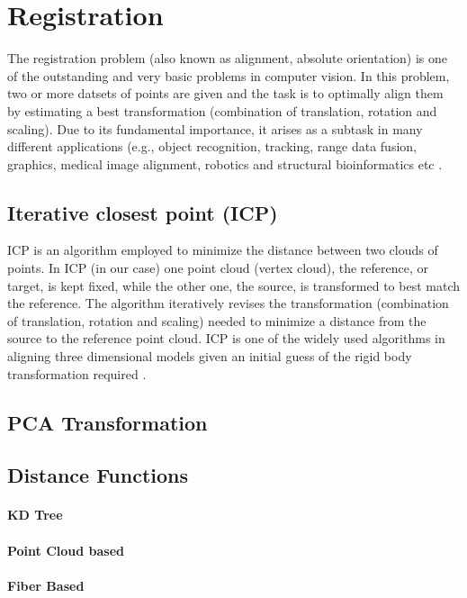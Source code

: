 \documentclass[../structure.tex]{subfiles}
\begin{document}
\section{Registration}
	The registration problem (also known as alignment, absolute orientation) is one of the outstanding and very basic problems in computer vision. In this problem, two or more datsets of points are given and the task is to optimally align them by estimating a best transformation (combination of translation, rotation and scaling). Due to its fundamental importance, it arises as a subtask in many different applications (e.g., object recognition, tracking, range data fusion, graphics, medical image alignment, robotics and structural bioinformatics etc \cite{Li2007}.
		\subsection{Iterative closest point (ICP)}
		ICP is an algorithm employed to minimize the distance between two clouds of points. %
		In ICP (in our case) one point cloud (vertex cloud), the reference, or target, is kept fixed, while the other one, the source, is transformed to best match the reference. The algorithm iteratively revises the transformation (combination of translation, rotation and scaling) needed to minimize a distance from the source to the reference point cloud. ICP is one of the widely used algorithms in aligning three dimensional models given an initial guess of the rigid body transformation required \cite{Rusinkiewicza2001}.
		\subsection{PCA Transformation}
		\subsection{Distance Functions}
			\paragraph{KD Tree}
			\paragraph{Point Cloud based}
			\paragraph{Fiber Based}
\end{document}
